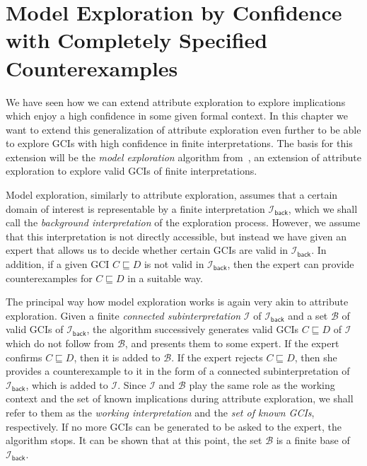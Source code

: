 \chapter[Model Exploration by Confidence]{Model Exploration by Confidence with Completely Specified Counterexamples}
\label{cha:model-expl-conf}

We have seen how we can extend attribute exploration to explore implications which enjoy a
high confidence in some given formal context.  In this chapter we want to extend this
generalization of attribute exploration even further to be able to explore GCIs with high
confidence in finite interpretations.  The basis for this extension will be the
\emph{model exploration} algorithm from~\cite{Diss-Felix}, an extension of attribute
exploration to explore valid GCIs of finite interpretations.

Model exploration, similarly to attribute exploration, assumes that a certain domain of
interest is representable by a finite interpretation $\mathcal{I}_{\mathsf{back}}$, which
we shall call the \emph{background interpretation} of the exploration process.  However,
we assume that this interpretation is not directly accessible, but instead we have given
an expert that allows us to decide whether certain GCIs are valid in
$\mathcal{I}_{\mathsf{back}}$.  In addition, if a given GCI $C \sqsubseteq D$ is not valid
in $\mathcal{I}_{\mathsf{back}}$, then the expert can provide counterexamples for $C
\sqsubseteq D$ in a suitable way.

The principal way how model exploration works is again very akin to attribute exploration.
Given a finite \emph{connected subinterpretation} $\mathcal{I}$ of
$\mathcal{I}_{\mathsf{back}}$ and a set $\mathcal{B}$ of valid GCIs of
$\mathcal{I}_{\mathsf{back}}$, the algorithm successively generates valid GCIs $C
\sqsubseteq D$ of $\mathcal{I}$ which do not follow from $\mathcal{B}$, and presents them
to some expert.  If the expert confirms $C \sqsubseteq D$, then it is added to
$\mathcal{B}$.  If the expert rejects $C \sqsubseteq D$, then she provides a
counterexample to it in the form of a connected subinterpretation of
$\mathcal{I}_{\mathsf{back}}$, which is added to $\mathcal{I}$.  Since $\mathcal{I}$ and
$\mathcal{B}$ play the same role as the working context and the set of known implications
during attribute exploration, we shall refer to them as the \emph{working interpretation}
and the \emph{set of known GCIs}, respectively.  If no more GCIs can be generated to be
asked to the expert, the algorithm stops.  It can be shown that at this point, the set
$\mathcal{B}$ is a finite base of $\mathcal{I}_{\mathsf{back}}$.


